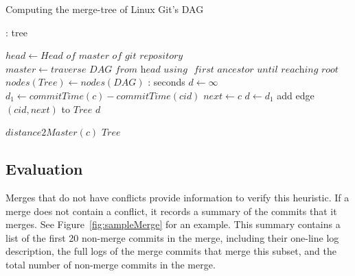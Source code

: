\documentclass[conference, draftclsnofoot, draft]{IEEEtran}
\begin{document}
\begin{algorithm}
\caption{Computing the merge-tree of Linux Git's DAG}\label{fig:alg}
\begin{algorithmic}
: tree 

\State $head \gets \textit{Head of master of git repository}$
\State $master \gets \textit{traverse DAG from head using }$
\State \quad\quad\quad\quad $\textit{first ancestor until reaching root}$
\State $nodes(Tree) \gets nodes(DAG)$
\State {} : seconds 
\State {}
\EndIf
\State    $d \gets 	\infty$
      \State $d_1 \gets commitTime(c)-commitTime(cid)$
      \Else
      \EndIf
    \State $next \gets c$
   \State  $d \gets d_1$
   \EndIf
   \EndFor
   \State add edge $(cid, next)$ to $Tree$
   \State \Return $d$ 
\EndFunction

\State $distance2Master(c)$
\EndFor
\State \Return $Tree$
\EndFunction
\end{algorithmic}
\end{algorithm}

\subsection{Evaluation}

Merges that do not have conflicts provide information to verify this heuristic. If a merge does not contain a conflict, it records a summary of the commits that
it merges. See Figure~\ref{fig:sampleMerge} for an example. This summary contains a list of the first 20 non-merge commits in the merge, including their one-line
log description, the full logs of the merge commits that merge this subset, and the total number of non-merge commits in the merge.  
\end{document}

